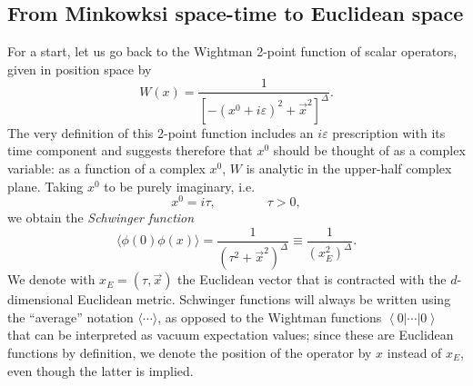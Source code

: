 \documentclass[a4paper,12pt]{article}
\newcommand{\ket}[1]{\left| #1 \right\rangle}
\newcommand{\bra}[1]{\left\langle #1 \right|}
\numberwithin{equation}{section}
\begin{document}
\subsection{From Minkowksi space-time to Euclidean space}

For a start, let us go back to the Wightman 2-point function of scalar operators, given in position space by
\begin{equation}
	W(x) = \frac{1}{\left[ -(x^0 + i \varepsilon)^2
	+ \vec{x}^2 \right]^\Delta}.
\end{equation}
The very definition of this 2-point function includes an $i \varepsilon$ prescription with its time component and suggests therefore that $x^0$ should be thought of as a complex variable: as a function of a complex $x^0$, $W$ is analytic in the upper-half complex plane. Taking $x^0$ to be purely imaginary, i.e.
\begin{equation}
	x^0 = i \tau,
	\qquad\qquad
	\tau > 0,
\end{equation}
we obtain the \emph{Schwinger function}
\begin{equation}
	\langle \phi(0) \phi(x) \rangle
	= \frac{1}{( \tau^2 + \vec{x}^2 )^\Delta}
	\equiv \frac{1}{(x_E^2)^\Delta}.
	\label{eq:2pt:Schwinger}
\end{equation}
We denote with $x_E = (\tau, \vec{x})$ the Euclidean vector that is contracted with the $d$-dimensional Euclidean metric. Schwinger functions will always be written using the ``average'' notation $\langle \cdots \rangle$, as opposed to the Wightman functions $\bra{0} \cdots \ket{0}$ that can be interpreted as vacuum expectation values; since these are Euclidean functions by definition, we denote the position of the operator by $x$ instead of $x_E$, even though the latter is implied.
\end{document}
